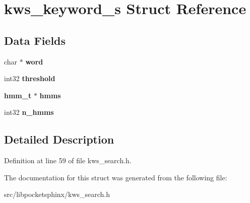 \section{kws\+\_\+keyword\+\_\+s Struct Reference}
\label{structkws__keyword__s}
\subsection*{Data Fields}
\begin{DoxyCompactItemize}
\item 
char $\ast$ {\bfseries word}\label{structkws__keyword__s_a7550b0ed8c435c23d87775d918835643}

\item 
int32 {\bfseries threshold}\label{structkws__keyword__s_a0b1f32994f66007b2cc4cd5821c97338}

\item 
{\bf hmm\+\_\+t} $\ast$ {\bfseries hmms}\label{structkws__keyword__s_a9a8d85824c151cedf89fc16d634eac91}

\item 
int32 {\bfseries n\+\_\+hmms}\label{structkws__keyword__s_a41c3ea132452b11712ff77a9ed917750}

\end{DoxyCompactItemize}


\subsection{Detailed Description}


Definition at line 59 of file kws\+\_\+search.\+h.



The documentation for this struct was generated from the following file\+:\begin{DoxyCompactItemize}
\item 
src/libpocketsphinx/kws\+\_\+search.\+h\end{DoxyCompactItemize}
